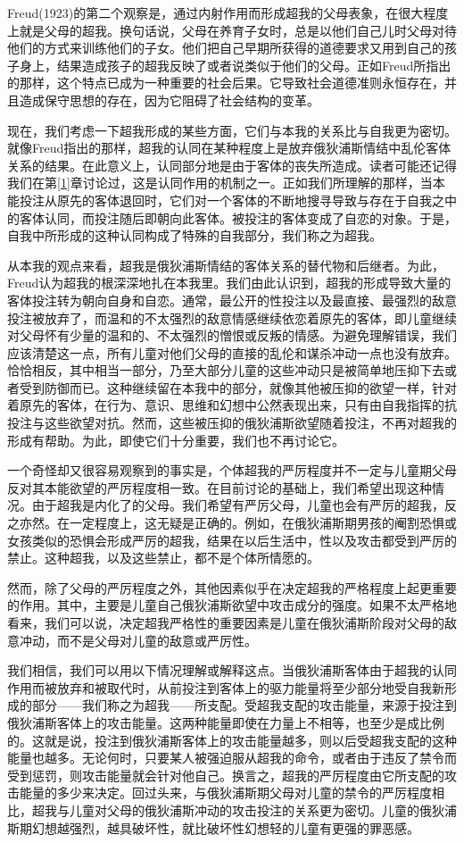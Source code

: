 \documentclass[UTF8,10pt,a4paper,openany]{book}
\begin{document}
Freud(1923)的第二个观察是，通过内射作用而形成超我的父母表象，在很大程度上就是父母的超我。换句话说，父母在养育子女时，总是以他们自己儿时父母对待他们的方式来训练他们的子女。他们把自己早期所获得的道德要求又用到自己的孩子身上，结果造成孩子的超我反映了或者说类似于他们的父母。正如Freud所指出的那样，这个特点已成为一种重要的社会后果。它导致社会道德准则永恒存在，并且造成保守思想的存在，因为它阻碍了社会结构的变革。

现在，我们考虑一下超我形成的某些方面，它们与本我的关系比与自我更为密切。就像Freud指出的那样，超我的认同在某种程度上是放弃俄狄浦斯情结中乱伦客体关系的结果。在此意义上，认同部分地是由于客体的丧失所造成。读者可能还记得我们在第\ref{1}章讨论过，这是认同作用的机制之一。正如我们所理解的那样，当本能投注从原先的客体退回时，它们对一个客体的不断地搜寻导致与存在于自我之中的客体认同，而投注随后即朝向此客体。被投注的客体变成了自恋的对象。于是，自我中所形成的这种认同构成了特殊的自我部分，我们称之为超我。

从本我的观点来看，超我是俄狄浦斯情结的客体关系的替代物和后继者。为此，Freud认为超我的根深深地扎在本我里。我们由此认识到，超我的形成导致大量的客体投注转为朝向自身和自恋。通常，最公开的性投注以及最直接、最强烈的敌意投注被放弃了，而温和的不太强烈的敌意情感继续依恋着原先的客体，即儿童继续对父母怀有少量的温和的、不太强烈的憎恨或反叛的情感。为避免理解错误，我们应该清楚这一点，所有儿童对他们父母的直接的乱伦和谋杀冲动一点也没有放弃。恰恰相反，其中相当一部分，乃至大部分儿童的这些冲动只是被简单地压抑下去或者受到防御而已。这种继续留在本我中的部分，就像其他被压抑的欲望一样，针对着原先的客体，在行为、意识、思维和幻想中公然表现出来，只有由自我指挥的抗投注与这些欲望对抗。然而，这些被压抑的俄狄浦斯欲望随着投注，不再对超我的形成有帮助。为此，即使它们十分重要，我们也不再讨论它。

一个奇怪却又很容易观察到的事实是，个体超我的严厉程度并不一定与儿童期父母反对其本能欲望的严厉程度相一致。在目前讨论的基础上，我们希望出现这种情况。由于超我是内化了的父母。我们希望有严厉父母，儿童也会有严厉的超我，反之亦然。在一定程度上，这无疑是正确的。例如，在俄狄浦斯期男孩的阉割恐惧或女孩类似的恐惧会形成严厉的超我，结果在以后生活中，性以及攻击都受到严厉的禁止。这种超我，以及这些禁止，都不是个体所情愿的。

然而，除了父母的严厉程度之外，其他因素似乎在决定超我的严格程度上起更重要的作用。其中，主要是儿童自己俄狄浦斯欲望中攻击成分的强度。如果不太严格地看来，我们可以说，决定超我严格性的重要因素是儿童在俄狄浦斯阶段对父母的敌意冲动，而不是父母对儿童的敌意或严厉性。

我们相信，我们可以用以下情况理解或解释这点。当俄狄浦斯客体由于超我的认同作用而被放弃和被取代时，从前投注到客体上的驱力能量将至少部分地受自我新形成的部分——我们称之为超我——所支配。受超我支配的攻击能量，来源于投注到俄狄浦斯客体上的攻击能量。这两种能量即使在力量上不相等，也至少是成比例的。这就是说，投注到俄狄浦斯客体上的攻击能量越多，则以后受超我支配的这种能量也越多。无论何时，只要某人被强迫服从超我的命令，或者由于违反了禁令而受到惩罚，则攻击能量就会针对他自己。换言之，超我的严厉程度由它所支配的攻击能量的多少来决定。回过头来，与俄狄浦斯期父母对儿童的禁令的严厉程度相比，超我与儿童对父母的俄狄浦斯冲动的攻击投注的关系更为密切。儿童的俄狄浦斯期幻想越强烈，越具破坏性，就比破坏性幻想轻的儿童有更强的罪恶感。
\end{document}
